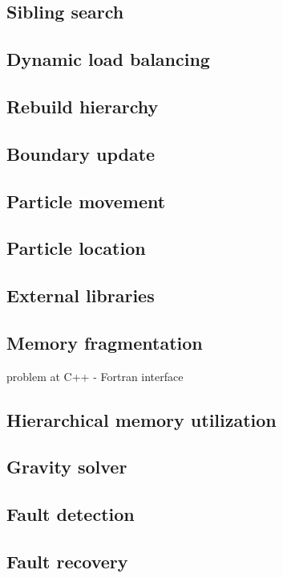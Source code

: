 \documentclass{article}
\begin{document}
\subsection{Sibling search}\label{issue:amr-neighbors}
\subsection{Dynamic load balancing} \label{issue:amr-balance}
\subsection{Rebuild hierarchy} \label{issue:amr-rebuild}
\subsection{Boundary update} \label{issue:amr-ghost-update}
\subsection{Particle movement} \label{issue:particle-movement}
\subsection{Particle location} \label{issue:particle-location}
\subsection{External libraries} \label{issue:libraries}
\subsection{Memory fragmentation} \label{issue:memory-fragment}
   problem at C++ - Fortran interface 
\subsection{Hierarchical memory utilization} \label{issue:memory-hierarchy-use}
\subsection{Gravity solver} \label{issue:method-gravity}
\subsection{Fault detection} \label{issue:fault-detect}
\subsection{Fault recovery} \label{issue:fault-recover}
\end{document}
